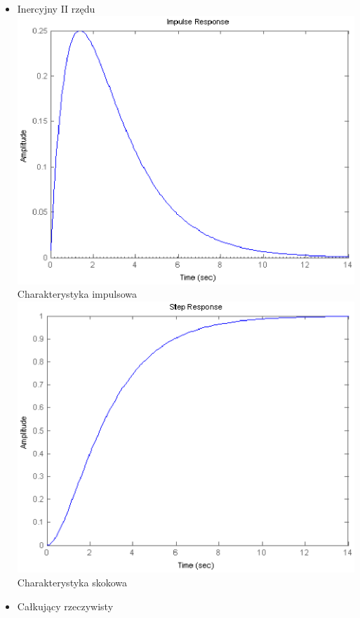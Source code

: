 \documentclass[a4paper,10pt]{article}
\begin{document}
\begin{itemize}
\begin{itemize}
\newpage
\item Inercyjny II rzędu 
\newline \includegraphics[scale=0.9]{CW1-inercyjny2-impuls.eps}\newline Charakterystyka impulsowa
\newline \includegraphics[scale=0.9]{CW1-inercyjny2-skok.eps}\newline Charakterystyka skokowa  
\newpage
\item Całkujący rzeczywisty 

\end{itemize}
\end{itemize}
\end{document}
